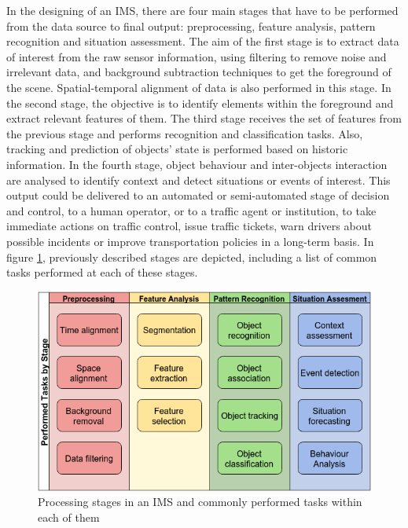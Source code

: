 
In the designing of an IMS, there are four main stages that have to be performed from the data source to final output: preprocessing, feature analysis, pattern recognition and situation assessment. The aim of the first stage is to extract data of interest from the raw sensor information, using filtering to remove noise and irrelevant data, and background subtraction techniques to get the foreground of the scene. Spatial-temporal alignment of data is also performed in this stage. In the second stage, the objective is to identify elements within the foreground and extract relevant features of them. The third stage receives the set of features from the previous stage and performs recognition and classification tasks. Also, tracking and prediction of objects' state is performed based on historic information. In the fourth stage, object behaviour and inter-objects interaction are analysed to identify context and detect situations or events of interest. This output could be delivered to an automated or semi-automated stage of decision and control, to a human operator, or to a traffic agent or institution, to take immediate actions on traffic control, issue traffic tickets, warn drivers about possible incidents or improve transportation policies in a long-term basis. In figure \ref{proc_stages}, previously described stages are depicted, including a list of common tasks performed at each of these stages.

\begin{figure}[ht!]
\centering
\includegraphics[scale=0.55]{fig/3/processing_stages_and_tasks.png}
\caption{Processing stages in an IMS and commonly performed tasks within each of them}
\label{proc_stages}
\end{figure}


